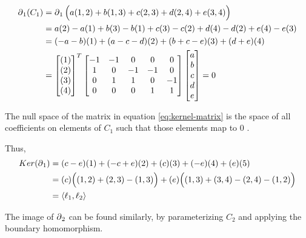 \begin{example}
    \begin{align}
        \operatorname{\partial}_1(C_1) &= \operatorname{\partial}_1\Big( a(1,2) + b(1,3) + c(2,3) + d(2,4) + e(3,4) \Big) \\
        &= a(2) - a(1) + b(3) - b(1) + c(3) - c(2) + d(4) - d(2) + e(4) - e(3)\\
        &= (-a - b)(1) + (a - c - d)(2) + (b + c - e)(3) + (d + e)(4) \\
        &=  \begin{bmatrix}
                (1)\\(2)\\(3)\\(4)\\
            \end{bmatrix}^T
            \begin{bmatrix}
                -1 & -1 &  0 &  0 &  0 \\
                1 &  0 & -1 & -1 &  0 \\
                0 &  1 &  1 &  0 & -1 \\
                0 &  0 &  0 &  1 &  1 \\
            \end{bmatrix}
            \begin{bmatrix}
                a\\b\\c\\d\\e\\
            \end{bmatrix}
        = 0 \label{eq:kernel-matrix}
    \end{align}

    The null space of the matrix in equation \eqref{eq:kernel-matrix} is the space of all coefficients on elements of \(C_1\) such that those elements map to 0 .

    Thus,
    \begin{align}
        Ker(\operatorname{\partial}_1) &= (c - e)(1) + (-c + e)(2) + (c)(3) + (-e)(4) + (e)(5)\\
            &= (c)\Big( (1,2) + (2,3) - (1,3)\Big) + (e)\Big((1,3) + (3,4) - (2,4) - (1,2)\Big) \\
            &= \langle \ell_1, \ell_2 \rangle
    \end{align}

    The image of \(\operatorname{\partial}_2\) can be found similarly, by parameterizing \(C_2\) and applying the boundary homomorphism.


\end{example}
